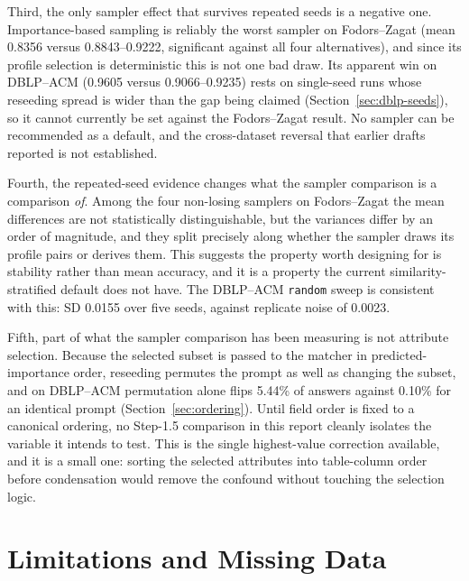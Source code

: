 \documentclass[11pt]{article}
\begin{document}
Third, the only sampler effect that survives repeated seeds is a negative one.
Importance-based sampling is reliably the worst sampler on Fodors--Zagat (mean
0.8356 versus 0.8843--0.9222, significant against all four alternatives), and since
its profile selection is deterministic this is not one bad draw. Its apparent win on
DBLP--ACM (0.9605 versus 0.9066--0.9235) rests on single-seed runs whose reseeding
spread is wider than the gap being claimed (Section~\ref{sec:dblp-seeds}), so it
cannot currently be set against the Fodors--Zagat result. No sampler can be
recommended as a default, and the cross-dataset reversal that earlier drafts reported
is not established.

Fourth, the repeated-seed evidence changes what the sampler comparison is a
comparison \emph{of}. Among the four non-losing samplers on Fodors--Zagat the mean
differences are not statistically distinguishable, but the variances differ by an
order of magnitude, and they split precisely along whether the sampler draws its
profile pairs or derives them. This suggests the property worth designing for is
stability rather than mean accuracy, and it is a property the current
similarity-stratified default does not have. The DBLP--ACM \texttt{random} sweep is
consistent with this: SD 0.0155 over five seeds, against replicate noise of 0.0023.

Fifth, part of what the sampler comparison has been measuring is not attribute
selection. Because the selected subset is passed to the matcher in predicted-importance
order, reseeding permutes the prompt as well as changing the subset, and on DBLP--ACM
permutation alone flips 5.44\% of answers against 0.10\% for an identical prompt
(Section~\ref{sec:ordering}). Until field order is fixed to a canonical ordering, no
Step-1.5 comparison in this report cleanly isolates the variable it intends to test.
This is the single highest-value correction available, and it is a small one: sorting
the selected attributes into table-column order before condensation would remove the
confound without touching the selection logic.

\section{Limitations and Missing Data}
\label{sec:limitations}
\end{document}
